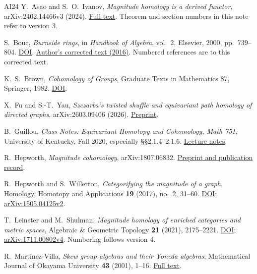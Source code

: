 \documentclass[11pt,a4paper]{article}
\numberwithin{equation}{section}
\theoremstyle{definition}
\theoremstyle{remark}
\begin{document}
\begin{thebibliography}{AI24}
Y.~Asao and S.~O.~Ivanov,
\emph{Magnitude homology is a derived functor},
arXiv:2402.14466v3 (2024).
\href{https://arxiv.org/html/2402.14466v3}{Full text}.
Theorem and section numbers in this note refer to version 3.

S.~Bouc, \emph{Burnside rings}, in \emph{Handbook of Algebra},
vol.~2, Elsevier, 2000, pp.~739--804.
\href{https://doi.org/10.1016/S1570-7954(00)80043-1}{DOI}.
\href{https://lamfa.u-picardie.fr/bouc/burnamscorr.pdf}{Author's corrected text (2016)}.
Numbered references are to this corrected text.

K.~S.~Brown, \emph{Cohomology of Groups}, Graduate Texts in
Mathematics 87, Springer, 1982.
\href{https://doi.org/10.1007/978-1-4684-9327-6}{DOI}.

X.~Fu and S.-T.~Yau,
\emph{Szczarba's twisted shuffle and equivariant path homology of
directed graphs}, arXiv:2603.09406 (2026).
\href{https://arxiv.org/abs/2603.09406}{Preprint}.

B.~Guillou, \emph{Class Notes: Equivariant Homotopy and Cohomology,
Math 751}, University of Kentucky,
Fall 2020, especially \S\S2.1.4--2.1.6.
\href{https://www.ms.uky.edu/~guillou/F20/751Notes.pdf}{Lecture notes}.

R.~Hepworth, \emph{Magnitude cohomology},
arXiv:1807.06832.
\href{https://arxiv.org/abs/1807.06832}{Preprint and publication record}.

R.~Hepworth and S.~Willerton,
\emph{Categorifying the magnitude of a graph},
Homology, Homotopy and Applications \textbf{19} (2017), no.~2, 31--60.
\href{https://doi.org/10.4310/HHA.2017.v19.n2.a3}{DOI};
\href{https://arxiv.org/pdf/1505.04125v2}{arXiv:1505.04125v2}.

T.~Leinster and M.~Shulman,
\emph{Magnitude homology of enriched categories and metric spaces},
Algebraic \& Geometric Topology \textbf{21} (2021), 2175--2221.
\href{https://doi.org/10.2140/agt.2021.21.2175}{DOI};
\href{https://arxiv.org/abs/1711.00802v4}{arXiv:1711.00802v4}.
Numbering follows version 4.

R.~Mart\'inez-Villa,
\emph{Skew group algebras and their Yoneda algebras},
Mathematical Journal of Okayama University \textbf{43} (2001), 1--16.
\href{https://www.math.okayama-u.ac.jp/mjou/mjou43/_Martinez-Villa.pdf}{Full text}.


\end{thebibliography}
\end{document}
